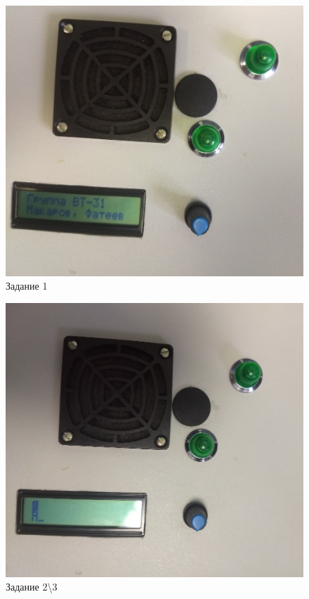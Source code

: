 \begin{figure}
\centering
\includegraphics{./files/pic1.jpg}
\caption{Задание 1}
\end{figure}

\begin{figure}
\centering
\includegraphics{./files/pic2.jpg}
\caption{Задание 2\textbackslash3}
\end{figure}

